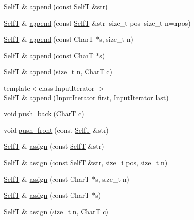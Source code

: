 \begin{CompactItemize}
\item 
\hyperlink{classbbt__string}{SelfT} \& \hyperlink{classbbt__string_b180cabdee6b7d393fc4e32230445051}{append} (const \hyperlink{classbbt__string}{SelfT} \&str)
\item 
\hyperlink{classbbt__string}{SelfT} \& \hyperlink{classbbt__string_9f1e0deb4ea27ec60dc578bb4d3cb7b8}{append} (const \hyperlink{classbbt__string}{SelfT} \&str, size\_\-t pos, size\_\-t n=npos)
\item 
\hyperlink{classbbt__string}{SelfT} \& \hyperlink{classbbt__string_6386d346b67e828d43b66f44037a66b3}{append} (const CharT $\ast$s, size\_\-t n)
\item 
\hyperlink{classbbt__string}{SelfT} \& \hyperlink{classbbt__string_a5c997633467454dc7f88198d818a564}{append} (const CharT $\ast$s)
\item 
\hyperlink{classbbt__string}{SelfT} \& \hyperlink{classbbt__string_a9fd465e48c33f4f219fc2d0ee41f40e}{append} (size\_\-t n, CharT c)
\item 
{\footnotesize template$<$class InputIterator $>$ }\\\hyperlink{classbbt__string}{SelfT} \& \hyperlink{classbbt__string_4ec194b339536af3683b94410c3d492c}{append} (InputIterator first, InputIterator last)
\item 
void \hyperlink{classbbt__string_a458692ed9ffa90e7634f36b3944bda2}{push\_\-back} (CharT c)
\item 
void \hyperlink{classbbt__string_c4c5765d2a4ea6575342f460e10f70ba}{push\_\-front} (const \hyperlink{classbbt__string}{SelfT} \&str)
\item 
\hyperlink{classbbt__string}{SelfT} \& \hyperlink{classbbt__string_a2171144958b01ccef526ec918229697}{assign} (const \hyperlink{classbbt__string}{SelfT} \&str)
\item 
\hyperlink{classbbt__string}{SelfT} \& \hyperlink{classbbt__string_9fa5926de65736614641d94c9cba83bf}{assign} (const \hyperlink{classbbt__string}{SelfT} \&str, size\_\-t pos, size\_\-t n)
\item 
\hyperlink{classbbt__string}{SelfT} \& \hyperlink{classbbt__string_2f40712bf2f31915bfad61172f224827}{assign} (const CharT $\ast$s, size\_\-t n)
\item 
\hyperlink{classbbt__string}{SelfT} \& \hyperlink{classbbt__string_aff6d129e3e7ce9472f4e1a152f8d5fd}{assign} (const CharT $\ast$s)
\item 
\hyperlink{classbbt__string}{SelfT} \& \hyperlink{classbbt__string_34dde768fe5e866486424320e052228f}{assign} (size\_\-t n, CharT c)
\item 

\end{CompactItemize}
